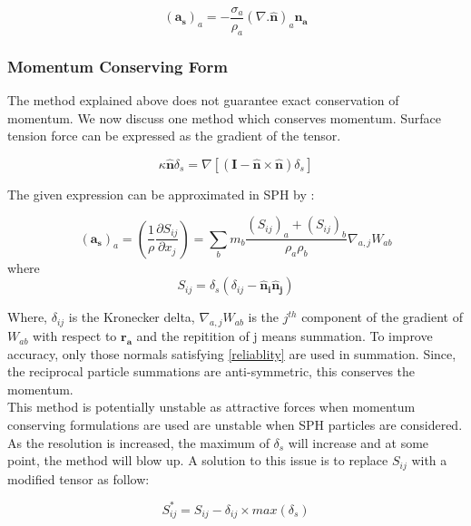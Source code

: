 \begin{equation}
 (\mathbf{a_s})_a = -\frac{\sigma_a}{\rho_a}(\nabla.\mathbf{\hat n})_a \mathbf{n_a}
\end{equation}


\subsubsection{Momentum Conserving Form}
The method explained above does not guarantee exact conservation of momentum. We now discuss one method which conserves momentum. Surface tension force can be expressed as the gradient of the tensor. \citep{Surface}

\begin{equation}
 \kappa \mathbf{\hat n} \delta_s = \nabla[(\mathbf{I} - \mathbf{\hat n}\times\mathbf{\hat n})\delta_s]
\end{equation}

\noindent
The given expression can be approximated in SPH by \citep{Morris}:

\begin{equation}
 (\mathbf{a_s})_a = \left( \frac{1}{\rho} \frac{\partial S_{ij}}{\partial x_j} \right) = \sum_b m_b \frac{(S_{ij})_a + (S_{ij})_b}{\rho_a \rho_b} \nabla_{a, j} W_{ab}
\end{equation}
\noindent
where 
\begin{equation}
 S_{ij} = \delta_s(\delta_{ij} - \mathbf{\hat n_i}\mathbf{\hat n_j})
\end{equation}

\noindent
Where, $\delta_{ij}$ is the Kronecker delta, $\nabla_{a,j}W_{ab}$ is the $j^{th}$ component of the gradient of $W_{ab}$ with respect to $\mathbf{r_a}$ and the repitition of j means summation. To improve accuracy, only those normals satisfying \ref{reliablity} are used in summation. Since, the reciprocal particle summations are anti-symmetric, this conserves the momentum.\\

This method is potentially unstable as attractive forces when momentum conserving formulations are used are unstable when SPH particles are considered.\\
As the resolution is increased, the maximum of $\delta_s$ will increase and at some point, the method will blow up. A solution to this issue is to replace $S_{ij}$ with a modified tensor as follow:

\begin{equation}
 S_{ij}^* = S_{ij} - \delta_{ij}\times max(\delta_s)
\end{equation}


